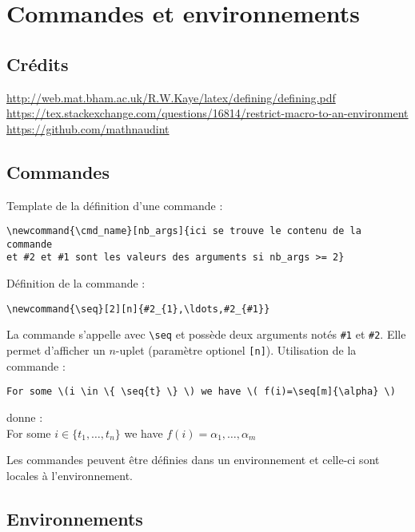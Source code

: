 \chapter{Commandes et environnements}
\minitoc

\newpage
\section{Crédits}

\url{http://web.mat.bham.ac.uk/R.W.Kaye/latex/defining/defining.pdf}
\url{https://tex.stackexchange.com/questions/16814/restrict-macro-to-an-environment}
\url{https://github.com/mathnaudint}

\section{Commandes}

Template de la définition d'une commande :
\begin{verbatim}
\newcommand{\cmd_name}[nb_args]{ici se trouve le contenu de la commande
et #2 et #1 sont les valeurs des arguments si nb_args >= 2}
\end{verbatim}


\newcommand{\seq}[2][n]{#2_{1},\ldots,#2_{#1}}
Définition de la commande :
\begin{verbatim}
\newcommand{\seq}[2][n]{#2_{1},\ldots,#2_{#1}}
\end{verbatim}

La commande s'appelle avec \verb+\seq+ et possède deux arguments notés \verb+#1+ et \verb+#2+. Elle permet d'afficher un $n$-uplet (paramètre optionel \verb+[n]+).
Utilisation de la commande :
\begin{verbatim}
For some \(i \in \{ \seq{t} \} \) we have \( f(i)=\seq[m]{\alpha} \)
\end{verbatim}
donne :\\
For some \(i \in \{ \seq{t} \} \) we have \( f(i)=\seq[m]{\alpha} \)

\bigskip
\par
Les commandes peuvent être définies dans un environnement et celle-ci sont locales à l'environnement.

\section{Environnements}

\newenvironment{qsi}[1]%
{\begin{quote}#1 wrote,\begin{sloppypar}\it}%
{\end{sloppypar}\end{quote}}




